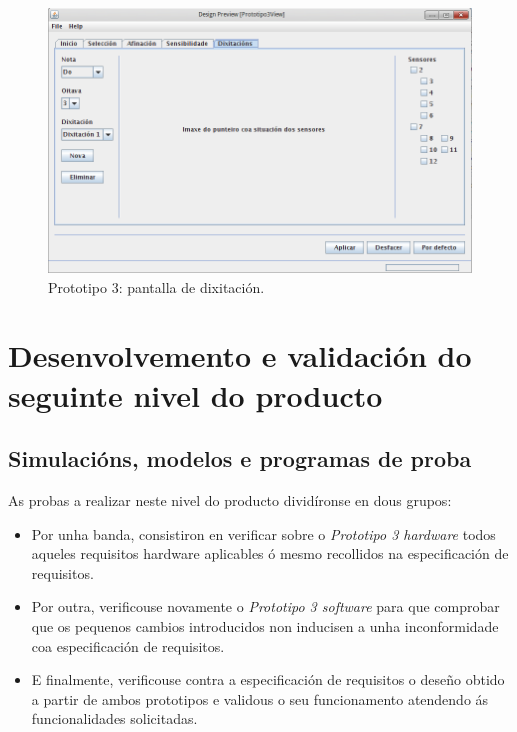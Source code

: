   \begin{figure}[htbp]
   \centering
   \includegraphics[scale=0.6,keepaspectratio=true]{./imagenes/prototipo3-5.png}
   \caption{Prototipo 3: pantalla de dixitación.}
   \label{figura:Prototipo3Dixitacion}
  \end{figure}

\section{Desenvolvemento e validación do seguinte nivel do producto}

 \subsection{Simulacións, modelos e programas de proba}

 As probas a realizar neste nivel do producto dividíronse en dous grupos:

 \begin{itemize}
  \item Por unha banda, consistiron en verificar sobre o
        \textit{Prototipo 3 hardware} todos aqueles requisitos hardware
        aplicables ó mesmo recollidos na especificación de requisitos.
  \item Por outra, verificouse novamente o \textit{Prototipo 3 software} para
        que comprobar que os pequenos cambios introducidos non inducisen a unha
        inconformidade coa especificación de requisitos.
  \item E finalmente, verificouse contra a especificación de requisitos o
        deseño obtido a partir de ambos prototipos e validous o seu
        funcionamento atendendo ás funcionalidades solicitadas.
 \end{itemize}

